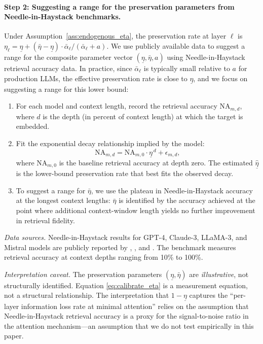 \paragraph{Step 2: Suggesting a range for the preservation parameters from Needle-in-Haystack benchmarks.} Under Assumption~\ref{ass:endogenous_eta}, the preservation rate at layer $\ell$ is $\eta_\ell = \underline{\eta} + (\bar{\eta} - \underline{\eta}) \cdot \bar{\alpha}_\ell / (\bar{\alpha}_\ell + a)$. We use publicly available data to suggest a range for the composite parameter vector $(\underline{\eta}, \bar{\eta}, a)$ using Needle-in-Haystack retrieval accuracy data. In practice, since $\bar{\alpha}_\ell$ is typically small relative to $a$ for production LLMs, the effective preservation rate is close to $\underline{\eta}$, and we focus on suggesting a range for this lower bound:
\begin{enumerate}
\item[(i)] For each model and context length, record the retrieval accuracy $\text{NA}_{m,d}$, where $d$ is the depth (in percent of context length) at which the target is embedded.
\item[(ii)] Fit the exponential decay relationship implied by the model:
\begin{equation}\label{eq:calibrate_eta}
\text{NA}_{m,d} = \text{NA}_{m,0} \cdot \underline{\eta}^{\,d} + \epsilon_{m,d},
\end{equation}
where $\text{NA}_{m,0}$ is the baseline retrieval accuracy at depth zero. The estimated $\hat{\underline{\eta}}$ is the lower-bound preservation rate that best fits the observed decay.
\item[(iii)] To suggest a range for $\bar{\eta}$, we use the plateau in Needle-in-Haystack accuracy at the longest context lengths: $\bar{\eta}$ is identified by the accuracy achieved at the point where additional context-window length yields no further improvement in retrieval fidelity.
\end{enumerate}

\textit{Data sources.} Needle-in-Haystack results for GPT-4, Claude-3, LLaMA-3, and Mistral models are publicly reported by \cite{kamradt2023needle}, \cite{anthropic2024context}, and \cite{liu2024lost}. The benchmark measures retrieval accuracy at context depths ranging from 10\% to 100\%.

\textit{Interpretation caveat.} The preservation parameters $(\underline{\eta}, \bar{\eta})$ are \emph{illustrative}, not structurally identified. Equation \ref{eq:calibrate_eta} is a measurement equation, not a structural relationship. The interpretation that $1 - \underline{\eta}$ captures the ``per-layer information loss rate at minimal attention'' relies on the assumption that Needle-in-Haystack retrieval accuracy is a proxy for the signal-to-noise ratio in the attention mechanism---an assumption that we do not test empirically in this paper.

